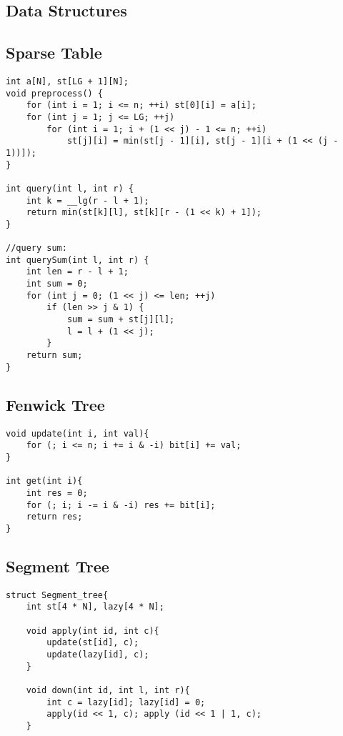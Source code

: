 \documentclass[11pt,a4paper]{article}
\begin{document}
\setcounter{tocdepth}{2}
\tableofcontents
\newpage

\begin{multicols*}{2}

\section{Data Structures}

\subsection{Sparse Table}
\begin{lstlisting}
int a[N], st[LG + 1][N];
void preprocess() {
    for (int i = 1; i <= n; ++i) st[0][i] = a[i];
    for (int j = 1; j <= LG; ++j)
        for (int i = 1; i + (1 << j) - 1 <= n; ++i)
            st[j][i] = min(st[j - 1][i], st[j - 1][i + (1 << (j - 1))]);
}

int query(int l, int r) {
    int k = __lg(r - l + 1);
    return min(st[k][l], st[k][r - (1 << k) + 1]);
}

//query sum:
int querySum(int l, int r) {
    int len = r - l + 1;
    int sum = 0;
    for (int j = 0; (1 << j) <= len; ++j)
        if (len >> j & 1) {
            sum = sum + st[j][l];
            l = l + (1 << j);
        }
    return sum;
}
\end{lstlisting}

\subsection{Fenwick Tree}
\begin{lstlisting}
void update(int i, int val){
    for (; i <= n; i += i & -i) bit[i] += val;
}

int get(int i){
    int res = 0;
    for (; i; i -= i & -i) res += bit[i];
    return res;
}
\end{lstlisting}

\subsection{Segment Tree}
\begin{lstlisting}
struct Segment_tree{
	int st[4 * N], lazy[4 * N];
	
    void apply(int id, int c){
        update(st[id], c);
        update(lazy[id], c);
    }

	void down(int id, int l, int r){
		int c = lazy[id]; lazy[id] = 0;
        apply(id << 1, c); apply (id << 1 | 1, c);
	}
	

\end{lstlisting}
\end{multicols*}
\end{document}
